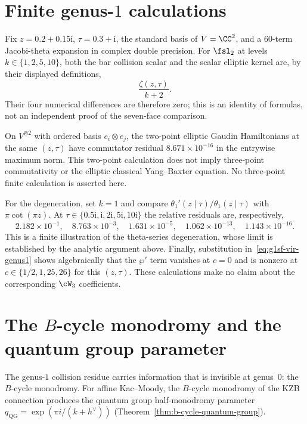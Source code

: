 \section{Finite genus-$1$ calculations}
\label{sec:g1sf-compute}

Fix $z=0.2+0.15\mathrm i$, $\tau=0.3+\mathrm i$, the standard basis
of $V=\CC^2$, and a $60$-term Jacobi-theta expansion in complex double
precision.  For $\fsl_2$ at levels $k\in\{1,2,5,10\}$, both the bar
collision scalar and the scalar elliptic kernel are, by their displayed
definitions,
\[
 \frac{\zeta(z,\tau)}{k+2}.
\]
Their four numerical differences are therefore zero; this is an
identity of formulas, not an independent proof of the seven-face
comparison.

On $V^{\otimes2}$ with ordered basis
$e_i\otimes e_j$, the two-point elliptic Gaudin Hamiltonians at the
same $(z,\tau)$ have commutator residual
$8.671\times10^{-16}$ in the entrywise maximum norm.  This
two-point calculation does not imply three-point commutativity or the
elliptic classical Yang--Baxter equation.  No three-point finite
calculation is asserted here.

For the degeneration, set $k=1$ and compare
$\theta_1'(z\mid\tau)/\theta_1(z\mid\tau)$ with
$\pi\cot(\pi z)$.  At
$\tau\in\{0.5\mathrm i,\mathrm i,2\mathrm i,5\mathrm i,10\mathrm i\}$
the relative residuals are, respectively,
\[
 2.182\times10^{-1},\quad 8.763\times10^{-3},\quad
 1.631\times10^{-5},\quad1.062\times10^{-13},\quad
 1.143\times10^{-16}.
\]
This is a finite illustration of the theta-series degeneration, whose
limit is established by the analytic argument above.  Finally,
substitution in~\eqref{eq:g1sf-vir-genus1} shows algebraically that the
$\wp'$ term vanishes at $c=0$ and is nonzero at
$c\in\{1/2,1,25,26\}$ for this $(z,\tau)$.  These calculations make no
claim about the corresponding $\cW_3$ coefficients.



\section{The $B$-cycle monodromy and the quantum group parameter}
\label{sec:g1sf-b-cycle}

The genus-$1$ collision residue carries information that is invisible
at genus~$0$: the $B$-cycle monodromy. For affine Kac--Moody, the
$B$-cycle monodromy of the KZB connection produces the quantum group
half-monodromy parameter $q_{\mathrm{QG}} = \exp(\pi i/(k + h^\vee))$
(Theorem~\ref{thm:b-cycle-quantum-group}).

